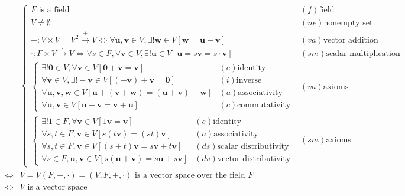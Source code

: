 \documentclass[
]{book}
\theoremstyle{definition}
\theoremstyle{definition}
\theoremstyle{definition}
\theoremstyle{definition}
\theoremstyle{remark}
\begin{document}
\[
\begin{aligned}
 & \begin{cases}
F\text{ is a field} & \left(f\right)\text{field}\\
V\ne\emptyset & \left(ne\right)\text{nonempty set}\\
+:V\times V=V^{2}\overset{+}{\rightarrow}V\Leftrightarrow\forall\boldsymbol{u},\boldsymbol{v}\in V,\exists!\boldsymbol{w}\in V\left[\boldsymbol{w}=\boldsymbol{u}+\boldsymbol{v}\right] & \left(va\right)\text{vector addition}\\
\cdot:F\times V\overset{\cdot}{\rightarrow}V\Leftrightarrow\forall s\in F,\forall\boldsymbol{v}\in V,\exists!\boldsymbol{u}\in V\left[\boldsymbol{u}=s\boldsymbol{v}=s\cdot\boldsymbol{v}\right] & \left(sm\right)\text{scalar multiplication}\\
\begin{cases}
\exists!\boldsymbol{0}\in V,\forall\boldsymbol{v}\in V\left[\boldsymbol{0}+\boldsymbol{v}=\boldsymbol{v}\right] & \left(e\right)\text{identity}\\
\forall\boldsymbol{v}\in V,\exists!-\boldsymbol{v}\in V\left[\left(-\boldsymbol{v}\right)+\boldsymbol{v}=\boldsymbol{0}\right] & \left(i\right)\text{inverse}\\
\forall\boldsymbol{u},\boldsymbol{v},\boldsymbol{w}\in V\left[\boldsymbol{u}+\left(\boldsymbol{v}+\boldsymbol{w}\right)=\left(\boldsymbol{u}+\boldsymbol{v}\right)+\boldsymbol{w}\right] & \left(a\right)\text{associativity}\\
\forall\boldsymbol{u},\boldsymbol{v}\in V\left[\boldsymbol{u}+\boldsymbol{v}=\boldsymbol{v}+\boldsymbol{u}\right] & \left(c\right)\text{commutativity}
\end{cases} & \left(va\right)\text{axioms}\\
\begin{cases}
\exists!1\in F,\forall\boldsymbol{v}\in V\left[1\boldsymbol{v}=\boldsymbol{v}\right] & \left(e\right)\text{identity}\\
\forall s,t\in F,\boldsymbol{v}\in V\left[s\left(t\boldsymbol{v}\right)=\left(st\right)\boldsymbol{v}\right] & \left(a\right)\text{associativity}\\
\forall s,t\in F,\boldsymbol{v}\in V\left[\left(s+t\right)\boldsymbol{v}=s\boldsymbol{v}+t\boldsymbol{v}\right] & \left(ds\right)\text{scalar distributivity}\\
\forall s\in F,\boldsymbol{u},\boldsymbol{v}\in V\left[s\left(\boldsymbol{u}+\boldsymbol{v}\right)=s\boldsymbol{u}+s\boldsymbol{v}\right] & \left(dv\right)\text{vector distributivity}
\end{cases} & \left(sm\right)\text{axioms}
\end{cases}\\
\Leftrightarrow & V=V\left(F,+,\cdot\right)=\left(V,F,+,\cdot\right)\text{ is a vector space over the field }F\\
\Leftrightarrow & V\text{ is a vector space}
\end{aligned}
\]
\end{document}
